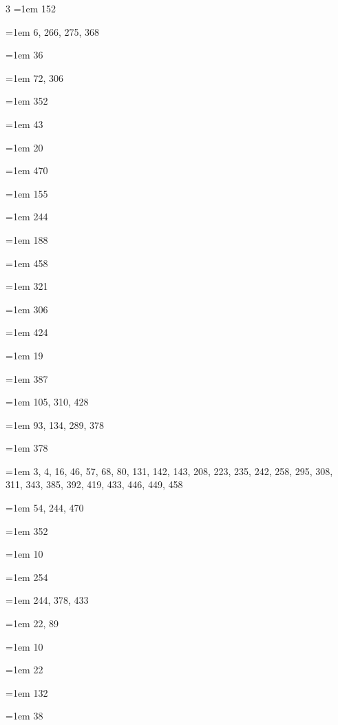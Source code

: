 \begin{multicols}{3}
\hangindent=1em  152\par
\hangindent=1em  6, 266, 275, 368\par
\hangindent=1em  36\par
\hangindent=1em  72, 306\par
\hangindent=1em  352\par
\hangindent=1em  43\par
\hangindent=1em  20\par
\hangindent=1em  470\par
\hangindent=1em  155\par
\hangindent=1em  244\par
\hangindent=1em  188\par
\hangindent=1em  458\par
\hangindent=1em  321\par
\hangindent=1em  306\par
\hangindent=1em  424\par
\hangindent=1em  19\par
\hangindent=1em  387\par
\hangindent=1em  105, 310, 428\par
\hangindent=1em  93, 134, 289, 378\par
\hangindent=1em  378\par
\hangindent=1em  3, 4, 16, 46, 57, 68, 80, 131, 142, 143, 208, 223, 235, 242, 258, 295, 308, 311, 343, 385, 392, 419, 433, 446, 449, 458\par
\hangindent=1em  54, 244, 470\par
\hangindent=1em  352\par
\hangindent=1em  10\par
\hangindent=1em  254\par
\hangindent=1em  244, 378, 433\par
\hangindent=1em  22, 89\par
\hangindent=1em  10\par
\hangindent=1em  22\par
\hangindent=1em  132\par
\hangindent=1em  38\par

\end{multicols}

